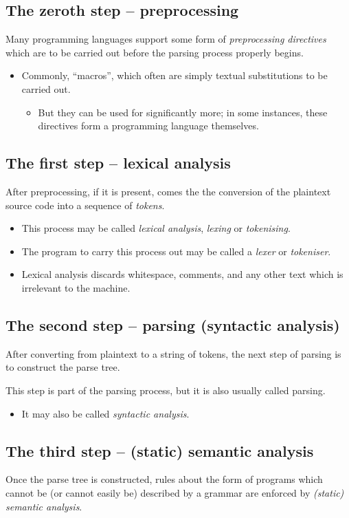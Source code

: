 \documentclass[11pt]{article}
\theoremstyle{definition}
\begin{document}
\subsection{The zeroth step – preprocessing}
\label{sec:orgec17283}
Many programming languages support some form
of \emph{preprocessing directives} which are
to be carried out before the parsing process
properly begins.
\begin{itemize}
\item Commonly, “macros”, which often are simply
textual substitutions to be carried out.
\begin{itemize}
\item But they can be used for significantly more;
in some instances, these directives
form a programming language themselves.
\end{itemize}
\end{itemize}

\subsection{The first step – lexical analysis}
\label{sec:orga920d02}
After preprocessing, if it is present, comes the
the conversion of the plaintext source code
into a sequence of \emph{tokens}.
\begin{itemize}
\item This process may be
called \emph{lexical analysis}, \emph{lexing} or \emph{tokenising}.
\item The program to carry this process out may be
called a \emph{lexer} or \emph{tokeniser}.
\item Lexical analysis discards whitespace, comments, and any other
text which is irrelevant to the machine.
\end{itemize}

\subsection{The second step – parsing (syntactic analysis)}
\label{sec:org6a8841b}
After converting from plaintext to a string of tokens, the next
step of parsing is to construct the parse tree.

This step is part of the parsing process,
but it is also usually called parsing.
\begin{itemize}
\item It may also be called \emph{syntactic analysis}.
\end{itemize}

\subsection{The third step – (static) semantic analysis}
\label{sec:orgb7a54e3}
Once the parse tree is constructed,
rules about the form of programs
which cannot be (or cannot easily be)
described by a grammar are enforced
by \emph{(static) semantic analysis}.
\end{document}
